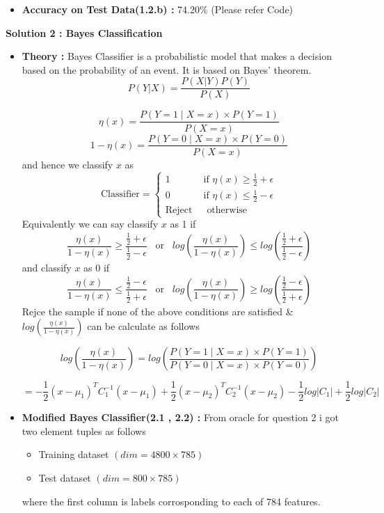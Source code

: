\documentclass{article}
\begin{document}
\begin{itemize}
    \item \textbf{Accuracy on Test Data(1.2.b) :} 74.20\% (Please refer Code)
\end{itemize}


\noindent \textbf{Solution 2 : Bayes Classification}  

\begin{itemize}
    \item    \textbf{Theory : } Bayes Classifier is a probabilistic model that makes a decision based on the probability of an event. It is based on Bayes' theorem.
        \[ P(Y|X) = \frac{P(X|Y)P(Y)}{P(X)} \]

        \[\eta(x) = \frac{P(Y=1 \mid X=x) \times P(Y=1)}{P(X=x)} \]
        \[1-\eta(x) = \frac{P(Y=0 \mid X=x) \times P(Y=0)}{P(X=x)} \]
        and hence we classify $x$ as 
        \[
    \text{Classifier} = \begin{cases}
            1 \hspace{37pt} \text{ if } \eta(x) \geq \frac{1}{2} + \epsilon \\
            0 \hspace{37pt} \text{ if } \eta(x) \leq \frac{1}{2} - \epsilon \\
            \text{Reject} \hspace{14pt} \text{ otherwise}
        \end{cases}
        \]
        Equivalently we can say classify $x$ as 1 if
        \[
            \frac{\eta(x)}{1-\eta(x)} \geq \frac{\frac{1}{2}+\epsilon}{\frac{1}{2}-\epsilon} \hspace{10pt} \text{or} \hspace{10pt} log \left( \frac{\eta(x)}{1-\eta(x)} \right) \leq log \left( \frac{\frac{1}{2}+\epsilon}{\frac{1}{2}-\epsilon} \right)
        \]
        and classify $x$ as 0 if
        \[
            \frac{\eta(x)}{1-\eta(x)} \leq \frac{\frac{1}{2}-\epsilon}{\frac{1}{2}+\epsilon} \hspace{10pt} \text{or} \hspace{10pt} log \left( \frac{\eta(x)}{1-\eta(x)} \right) \geq log \left( \frac{\frac{1}{2}-\epsilon}{\frac{1}{2}+\epsilon} \right)
        \]
        Rejce the sample if none of the above conditions are satisfied \& $log \left( \frac{\eta(x)}{1-\eta(x)} \right)$ can be calculate as follows

        \[ log \left( \frac{\eta(x)}{1-\eta(x)} \right) = log \left( \frac{P(Y=1 \mid X=x) \times P(Y=1)}{P(Y=0 \mid X=x) \times P(Y=0)} \right) \]

        \[= -\frac{1}{2} (x - \mu_1)^T C_1^{-1} (x - \mu_1) 
    + \frac{1}{2} (x - \mu_2)^T C_2^{-1} (x - \mu_2) 
    - \frac{1}{2} log |C_1| + \frac{1}{2} log |C_2|\]
    \item \textbf{Modified Bayes Classifier(2.1 , 2.2) :} From oracle for question 2 i got two element tuples as follows
    \begin{itemize}
        \item Training dataset $(dim = 4800 \times 785)$
        \item Test dataset $(dim = 800 \times 785)$
    \end{itemize}
    where the first column is labels corrosponding to each of 784 features.


\end{itemize}
\end{document}
